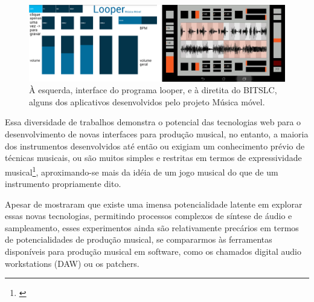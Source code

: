 \begin{figure}
    \caption{\label{mmovel}À esquerda, interface do programa looper, e à diretita do B\/I\/T\/S\/L\/C, alguns dos aplicativos desenvolvidos pelo projeto Música móvel.}
    
        \includegraphics[width=1\linewidth]{pictures/cap2/musicamovel}
    
\end{figure}



Essa diversidade de trabalhos demonstra o potencial das tecnologias web para o desenvolvimento de novas interfaces para produção musical, no entanto, a maioria dos instrumentos desenvolvidos até então ou exigiam um conhecimento prévio de técnicas musicais, ou são muitos simples e restritas em termos de expressividade musical\footnote{\cite{Dobrian2006}}, aproximando-se mais da idéia de um jogo musical do que de um instrumento propriamente dito. 


Apesar de mostraram que existe uma imensa potencialidade latente em explorar essas novas tecnologias, permitindo processos complexos de síntese de áudio e sampleamento, esses experimentos ainda são relativamente precários em termos de potencialidades de produção musical, se compararmos às ferramentas disponíveis para produção musical em software, como os chamados digital audio workstations (DAW) ou os patchers.